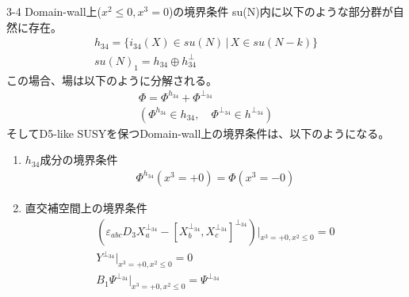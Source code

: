 \documentclass[dvipdfmx,a4paper,10.5pt]{article}
\numberwithin{equation}{section}
\begin{document}
\begin{resultbox}{3-4 Domain-wall上($x^{2}\leq0,x^{3}=0$)の境界条件}
    su(N)内に以下のような部分群が自然に存在。
    \begin{gather*}
        h_{34}=\{i_{34}(X)\in su(N)\,|\,X\in su(N-k)\}\\
        su(N)_{1}=h_{34}\oplus h_{34}^{\perp}
    \end{gather*}
    この場合、場は以下のように分解される。
    \begin{gather*}
        \Phi=\Phi^{h_{34}}+\Phi^{\perp_{34}}\\
        (\Phi^{h_{34}}\in h_{34},\quad \Phi^{\perp_{34}}\in h^{\perp_{34}})
    \end{gather*}
    そしてD5-like SUSYを保つDomain-wall上の境界条件は、以下のようになる。
    \begin{enumerate}
        \item $h_{34}$成分の境界条件
        \begin{align*}
            \Phi^{h_{34}}(x^{3}=+0)=\Phi(x^{3}=-0)
        \end{align*}
        \item 直交補空間上の境界条件
        \begin{gather*}
            (\varepsilon_{abc}D_{3}X_{a}^{\perp_{34}}-[X_{b}^{\perp_{34}},X_{c}^{\perp_{34}}]^{\perp_{34}})|_{x^{3}=+0,x^{2}\leq 0}=0\\
            Y^{\perp_{34}}|_{x^{3}=+0,x^{2}\leq 0}=0\\
            B_{1}\Psi^{\perp_{34}}|_{x^{3}=+0,x^{2}\leq 0}=\Psi^{\perp_{34}}
        \end{gather*}
    \end{enumerate}    
\end{resultbox}
\end{document}
